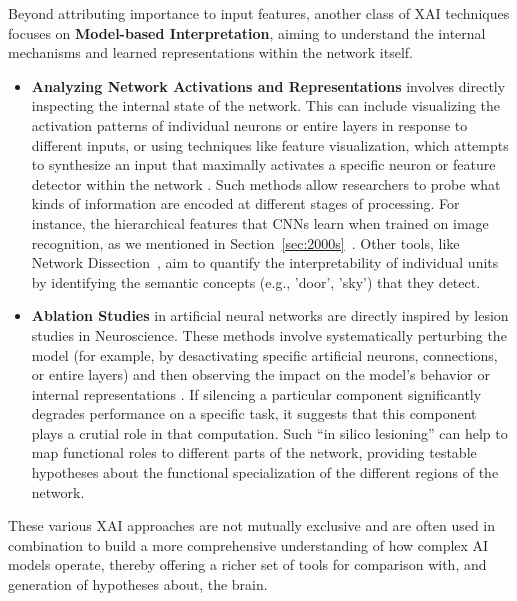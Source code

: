 Beyond attributing importance to input features, another class of XAI techniques focuses on \textbf{Model-based Interpretation}, aiming to understand the internal mechanisms and learned representations within the network itself.
\begin{itemize}
    \item \textbf{Analyzing Network Activations and Representations} involves directly inspecting the internal state of the network. This can include visualizing the activation patterns of individual neurons or entire layers in response to different inputs, or using techniques like feature visualization, which attempts to synthesize an input that maximally activates a specific neuron or feature detector within the network \cite{olah2018building}. Such methods allow researchers to probe what kinds of information are encoded at different stages of processing. For instance, the hierarchical features that CNNs learn when trained on image recognition, as we mentioned in Section~\ref{sec:2000s}~\cite{yamins2016using}. Other tools, like Network Dissection~\cite{bau2017network}, aim to quantify the interpretability of individual units by identifying the semantic concepts (e.g., 'door', 'sky') that they detect.

    \item \textbf{Ablation Studies} in artificial neural networks are directly inspired by lesion studies in Neuroscience. These methods involve systematically perturbing the model (for example, by desactivating specific artificial neurons, connections, or entire layers) and then observing the impact on the model's behavior or internal representations \cite{kriegeskorte2018cognitive}. If silencing a particular component significantly degrades performance on a specific task, it suggests that this component plays a crutial role in that computation. Such ``in silico lesioning'' can help to map functional roles to different parts of the network, providing testable hypotheses about the functional specialization of the different regions of the network.
\end{itemize}
These various XAI approaches are not mutually exclusive and are often used in combination to build a more comprehensive understanding of how complex AI models operate, thereby offering a richer set of tools for comparison with, and generation of hypotheses about, the brain.

